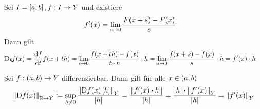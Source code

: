 \begin{bemerkung}
    \marginnote{[09. Jul]}
    Sei $I=\left[a,b\right], f: I \rightarrow{} Y$ und existiere
    \begin{align*}
        f'\of{x} &= \lim_{s\fromto 0} \frac{F\of{x+s} - F\of{x}}{s}
    \end{align*}
    Dann gilt
    \begin{align*}
        \text{D}_h\! f\of{x} = \frac{\dif f}{\dif t} f\of{x+th} &= \lim_{t\fromto 0} \frac{f\of{x+th} - f\of{x}}{t\cdot h} \cdot h = \lim_{s\fromto 0} \frac{f\of{x+s} - f\of{x}}{s} \cdot h = f'\of{x}\cdot h
    \end{align*}
\end{bemerkung}

\begin{bemerkung}
    Sei $f: \left(a,b\right)\rightarrow{} Y$ differenzierbar. Dann gilt für alle $x\in\left(a,b\right)$
    \begin{align*}
        \norm{\D f\of{x}}_{\R\fromto Y} \coloneqq \sup_{h\neq 0} \frac{\norm{\D f\of{x}\interv{h}}_Y}{\abs{h}} = \frac{\norm{f'\of{x}\cdot h}}{\abs{h}} = \frac{\abs{h}\cdot\norm{f'\of{x}}_Y}{\abs{h}} = \norm{f'\of{x}}_Y
    \end{align*}
\end{bemerkung}

